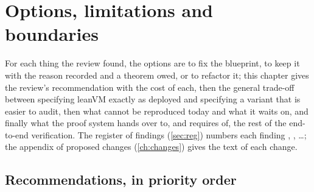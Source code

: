 \chapter{Options, limitations and boundaries}\label{ch:options}

For each thing the review found, the options are to fix the blueprint, to keep it with the
reason recorded and a theorem owed, or to refactor it; this chapter gives the review's
recommendation with the cost of each, then the general trade-off between specifying leanVM
exactly as deployed and specifying a variant that is easier to audit, then what cannot be
reproduced today and what it waits on, and finally what the proof system hands over to, and
requires of, the rest of the end-to-end verification. The register of findings
(\cref{sec:reg}) numbers each finding , , \ldots; the appendix of proposed
changes (\cref{ch:changes}) gives the text of each change.

\section{Recommendations, in priority order}\label{sec:opt-recommendations}

